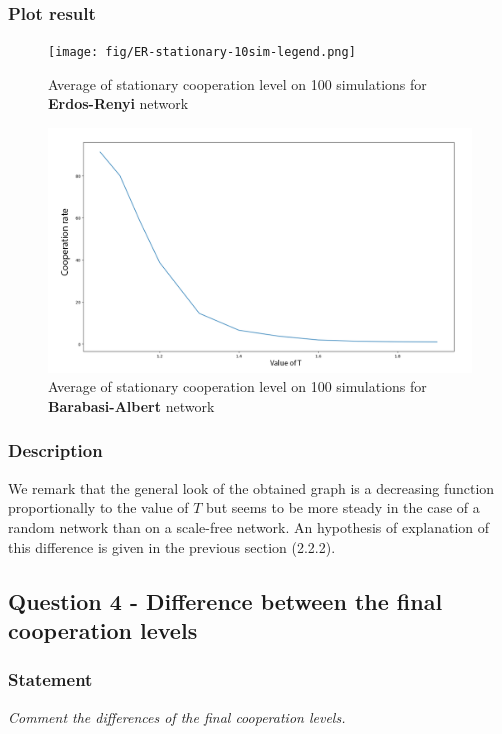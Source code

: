 \documentclass{article}
\begin{document}
\subsubsection{Plot result}

\begin{figure}[H]
  \centering
  \texttt{[image: fig/ER-stationary-10sim-legend.png]}
  \caption{Average of stationary cooperation level on 100 simulations for \textbf{Erdos-Renyi} network}
  \label{fig:IPD-ER-average}
\end{figure}

\begin{figure}[H]
  \centering
  \includegraphics[scale=1.5]{fig/BA-stationary-10sim-legend.png}
  \caption{Average of stationary cooperation level on 100 simulations for \textbf{Barabasi-Albert} network}
  \label{fig:IPD-BA-average}
\end{figure}

\subsubsection{Description}
We remark that the general look of the obtained graph is a decreasing function proportionally to the value of $T$ but seems to be more steady in the case of a random network than on a scale-free network. An hypothesis of explanation of this difference is given in the previous section (2.2.2). 

\subsection{Question 4 - Difference between the final cooperation levels}

\subsubsection*{Statement}
\textit{Comment the differences of the final cooperation levels.}
\end{document}

